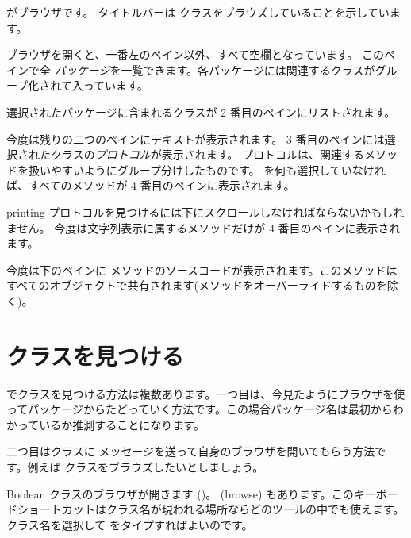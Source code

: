 \documentclass[a4paper,10pt,twoside]{book}
\begin{document}
 がブラウザです。
タイトルバーは  クラスをブラウズしていることを示しています。

ブラウザを開くと、一番左のペイン以外、すべて空欄となっています。
このペインで全 \emph{パッケージ}を一覧できます。各パッケージには関連するクラスがグループ化されて入っています。

選択されたパッケージに含まれるクラスが 2 番目のペインにリストされます。

今度は残りの二つのペインにテキストが表示されます。
3 番目のペインには選択されたクラスの\emph{プロトコル}が表示されます。
プロトコルは、関連するメソッドを扱いやすいようにグループ分けしたものです。
を何も選択していなければ、すべてのメソッドが 4 番目のペインに表示されます。

printing プロトコルを見つけるには下にスクロールしなければならないかもしれません。
今度は文字列表示に属するメソッドだけが 4 番目のペインに表示されます。

今度は下のペインに  メソッドのソースコードが表示されます。このメソッドはすべてのオブジェクトで共有されます(メソッドをオーバーライドするものを除く)。

\section{クラスを見つける}

\pharo でクラスを見つける方法は複数あります。一つ目は、今見たようにブラウザを使ってパッケージからたどっていく方法です。この場合パッケージ名は最初からわかっているか推測することになります。

二つ目はクラスに  メッセージを送って自身のブラウザを開いてもらう方法です。例えば クラスをブラウズしたいとしましょう。

Boolean クラスのブラウザが開きます ()。
  (browse) もあります。このキーボードショートカットはクラス名が現われる場所ならどのツールの中でも使えます。
クラス名を選択して  をタイプすればよいのです。
\end{document}
